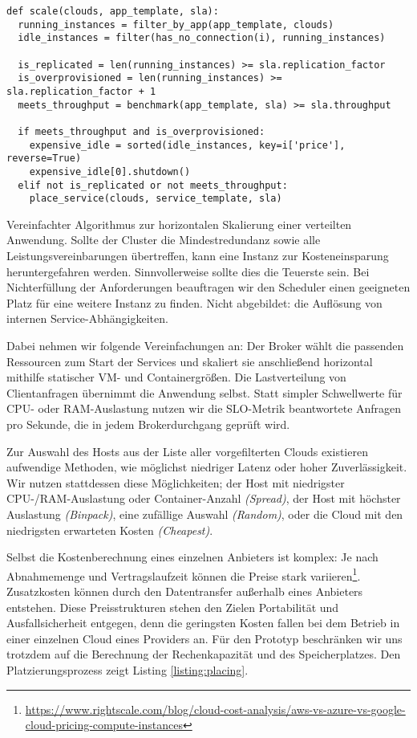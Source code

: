 \begin{listing}[ht]
\begin{verbatim}
def scale(clouds, app_template, sla):
  running_instances = filter_by_app(app_template, clouds)
  idle_instances = filter(has_no_connection(i), running_instances)
	
  is_replicated = len(running_instances) >= sla.replication_factor
  is_overprovisioned = len(running_instances) >= sla.replication_factor + 1
  meets_throughput = benchmark(app_template, sla) >= sla.throughput

  if meets_throughput and is_overprovisioned:
    expensive_idle = sorted(idle_instances, key=i['price'], reverse=True)
    expensive_idle[0].shutdown()
  elif not is_replicated or not meets_throughput:
    place_service(clouds, service_template, sla)
\end{verbatim}
\caption{Vereinfachter Algorithmus zur horizontalen Skalierung einer verteilten Anwendung. Sollte der Cluster die Mindestredundanz sowie alle Leistungsvereinbarungen übertreffen, kann eine Instanz zur Kosteneinsparung heruntergefahren werden. Sinnvollerweise sollte dies die Teuerste sein. Bei Nichterfüllung der Anforderungen beauftragen wir den Scheduler einen geeigneten Platz für eine weitere Instanz zu finden. Nicht abgebildet: die Auflösung von internen Service-Abhängigkeiten.}
\label{listing:scaling}
\end{listing}

Dabei nehmen wir folgende Vereinfachungen an: Der Broker wählt die passenden Ressourcen zum Start der Services und skaliert sie anschließend horizontal mithilfe statischer VM- und Containergrößen. Die Lastverteilung von Clientanfragen übernimmt die Anwendung selbst. Statt simpler Schwellwerte für CPU- oder RAM-Auslastung nutzen wir die SLO-Metrik beantwortete Anfragen pro Sekunde, die in jedem Brokerdurchgang geprüft wird.

Zur Auswahl des Hosts aus der Liste aller vorgefilterten Clouds existieren aufwendige Methoden, wie möglichst niedriger Latenz oder hoher Zuverlässigkeit. Wir nutzen stattdessen diese Möglichkeiten; der Host mit niedrigster CPU-/RAM-Auslastung oder Container-Anzahl \emph{(Spread)}, der Host mit höchster Auslastung \emph{(Binpack)}, eine zufällige Auswahl \emph{(Random)}, oder die Cloud mit den niedrigsten erwarteten Kosten \emph{(Cheapest)}.

Selbst die Kostenberechnung eines einzelnen Anbieters ist komplex: Je nach Abnahmemenge und Vertragslaufzeit können die Preise stark variieren\footnote{\url{https://www.rightscale.com/blog/cloud-cost-analysis/aws-vs-azure-vs-google-cloud-pricing-compute-instances}}. Zusatzkosten können durch den Datentransfer außerhalb eines Anbieters entstehen. Diese Preisstrukturen stehen den Zielen Portabilität und Ausfallsicherheit entgegen, denn die geringsten Kosten fallen bei dem Betrieb in einer einzelnen Cloud eines Providers an. Für den Prototyp beschränken wir uns trotzdem auf die Berechnung der Rechenkapazität und des Speicherplatzes. Den Platzierungsprozess zeigt Listing \ref{listing:placing}.

